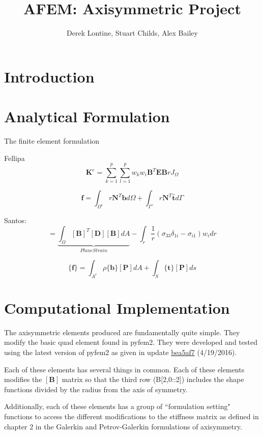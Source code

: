 \documentclass[10pt,letterpaper]{report}
\author{Derek Lontine, Stuart Childs, Alex Bailey}
\title{AFEM: Axisymmetric Project}
\numberwithin{equation}{chapter}
\begin{document}
\maketitle
\chapter{Introduction}

\chapter{Analytical Formulation}

The finite element formulation

Fellipa
\begin{equation}
\pmb{K}^e=\sum_{k=1}^p \sum_{l=1}^p w_k w_i \pmb{B}^T \pmb{E} \pmb{B} r J_\Omega
\end{equation}

\begin{equation}
\pmb{f}=\int_{\Omega^e} r \pmb{N}^T \pmb{b} d\Omega +\int_{\Gamma^e} r \pmb{N}^T \pmb{\hat{t}} d\Gamma
\end{equation}

Santos:
\begin{equation}
[\pmb{K}^e]=\underbrace{\int_{\Omega} [\pmb{B}]^T [\pmb{D}] [\pmb{B}] dA}_{Plane Strain} -\int_r \frac{1}{r} (\sigma_{33} \delta_{1i}-\sigma_{i 1}) w_i dr
\end{equation}

\begin{equation}
\{\pmb{f}\}=\int_{A^e} \rho \{ \pmb{b}\} [\pmb{P}] dA + \int_S \{\pmb{t}\} [\pmb{P}] ds
\end{equation}

\chapter{Computational Implementation}
The axisymmetric elements produced are fundamentally quite simple. They modify the basic quad element found in pyfem2. They were developed and tested using the latest version of pyfem2 as given in update \hyperlink{https://github.com/tjfulle/pyfem2/commit/bea5af7b7dc98cb5529406c07bc4a8b18ae5e584}{bea5af7} (4/19/2016).

Each of these elements has several things in common. Each of these elements modifies the $[\pmb{B}]$ matrix so that the third row (B[2,0::2]) includes the shape functions divided by the radius from the axis of symmetry.

Additionally, each of these elements has a group of ``formulation setting" functions to access the different modifications to the stiffness matrix as defined in chapter 2 in the Galerkin and Petrov-Galerkin formulations of axisymmetry. 
\end{document}
